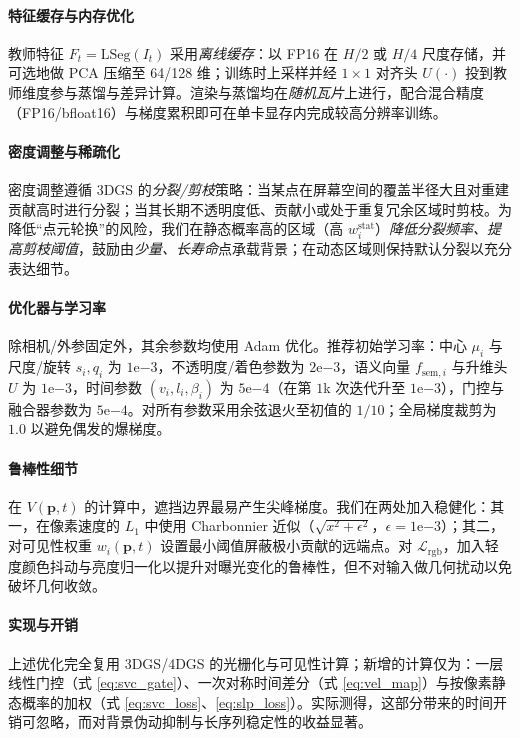 \documentclass[10pt,conference]{IEEEtran} %
\begin{document}
\paragraph{特征缓存与内存优化}
教师特征 $F_t{=}\mathrm{LSeg}(I_t)$ 采用\emph{离线缓存}：以 FP16 在 $H/2$ 或 $H/4$ 尺度存储，并可选地做 PCA 压缩至 64/128 维；训练时上采样并经 $1{\times}1$ 对齐头 $U(\cdot)$ 投到教师维度参与蒸馏与差异计算。渲染与蒸馏均在\emph{随机瓦片}上进行，配合混合精度（FP16/bfloat16）与梯度累积即可在单卡显存内完成较高分辨率训练。

\paragraph{密度调整与稀疏化}
密度调整遵循 3DGS 的\emph{分裂/剪枝}策略：当某点在屏幕空间的覆盖半径大且对重建贡献高时进行分裂；当其长期不透明度低、贡献小或处于重复冗余区域时剪枝。为降低“点元轮换”的风险，我们在静态概率高的区域（高 $w_i^{\mathrm{stat}}$）\emph{降低分裂频率、提高剪枝阈值}，鼓励由\emph{少量、长寿命}点承载背景；在动态区域则保持默认分裂以充分表达细节。

\paragraph{优化器与学习率}
除相机/外参固定外，其余参数均使用 Adam 优化。推荐初始学习率：中心 $\mu_i$ 与尺度/旋转 $s_i,q_i$ 为 $1\mathrm{e}{-3}$，不透明度/着色参数为 $2\mathrm{e}{-3}$，语义向量 $f_{\mathrm{sem},i}$ 与升维头 $U$ 为 $1\mathrm{e}{-3}$，时间参数 $(v_i,l_i,\beta_i)$ 为 $5\mathrm{e}{-4}$（在第 $1$k 次迭代升至 $1\mathrm{e}{-3}$），门控与融合器参数为 $5\mathrm{e}{-4}$。对所有参数采用余弦退火至初值的 $1/10$；全局梯度裁剪为 $1.0$ 以避免偶发的爆梯度。

\paragraph{鲁棒性细节}
在 $V(\mathbf p,t)$ 的计算中，遮挡边界最易产生尖峰梯度。我们在两处加入稳健化：其一，在像素速度的 $L_1$ 中使用 Charbonnier 近似（$\sqrt{x^2+\epsilon^2}$，$\epsilon{=}1\mathrm{e}{-3}$）；其二，对可见性权重 $w_i(\mathbf p,t)$ 设置最小阈值屏蔽极小贡献的远端点。对 $\mathcal L_{\mathrm{rgb}}$，加入轻度颜色抖动与亮度归一化以提升对曝光变化的鲁棒性，但不对输入做几何扰动以免破坏几何收敛。

\paragraph{实现与开销}
上述优化完全复用 3DGS/4DGS 的光栅化与可见性计算；新增的计算仅为：一层线性门控（式 \eqref{eq:svc_gate}）、一次对称时间差分（式 \eqref{eq:vel_map}）与按像素静态概率的加权（式 \eqref{eq:svc_loss}、\eqref{eq:slp_loss}）。实际测得，这部分带来的时间开销可忽略，而对背景伪动抑制与长序列稳定性的收益显著。
\end{document}
